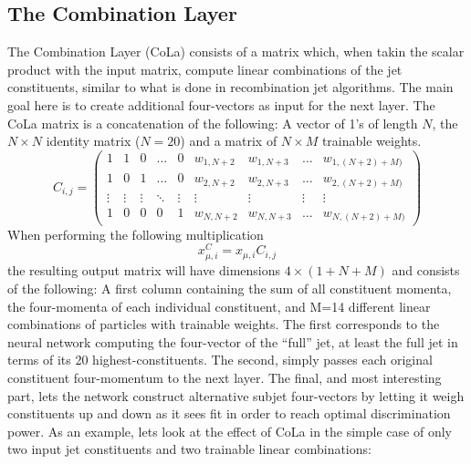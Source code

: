 \subsection{The Combination Layer}
\label{sec:cola}
The Combination Layer (CoLa) consists of a matrix which, when takin the scalar product with the input matrix, compute linear combinations of the jet constituents, similar to what is done in recombination jet algorithms. The main goal here is to create additional four-vectors as input for the next layer. The CoLa matrix is a concatenation of the following: A vector of 1's of length $N$, the $N \times N$ identity matrix ($N=20$) and a matrix of $N \times M$ trainable weights.
\begin{equation}
  C_{i,j}=\begin{pmatrix}
1 & 1 & 0 & \dots & 0 & w_{1,N+2} & w_{1,N+3}                & \dots & w_{1,(N+2)+M)} \\
1 & 0 & 1 & \dots & 0 & w_{2,N+2} & w_{2,N+3}                & \dots & w_{2,(N+2)+M)} \\
\vdots & \vdots & \vdots & \ddots & \vdots & \vdots & \vdots & \vdots & \vdots \\
1 & 0 & 0 & 0 & 1 & w_{N,N+2} & w_{N,N+3}                    & \dots & w_{N,(N+2)+M)} 
\end{pmatrix}
\end{equation}
When performing the following multiplication
\begin{equation}
  x_{\mu,i}^{C} = x_{\mu,i}  C_{i,j}
\end{equation}
the resulting output matrix will have dimensions $4 \times (1+N+M)$ and consists of the following: A first column containing the sum of all constituent momenta, the four-momenta of each individual constituent, and M=14 different linear combinations of particles with trainable weights. The first corresponds to the neural network computing the four-vector of the ``full'' jet, at least the full jet in terms of its 20 highest-\PT constituents. The second, simply passes each original constituent four-momentum to the next layer. The final, and most interesting part, lets the network construct alternative subjet four-vectors by letting it weigh constituents up and down as it sees fit in order to reach optimal discrimination power. As an example, lets look at the effect of CoLa in the simple case of only two input jet constituents and two trainable linear combinations:
